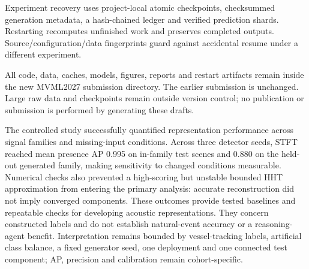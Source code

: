 \documentclass[11pt,letterpaper]{article}
\begin{document}
Experiment recovery uses project-local atomic checkpoints, checksummed generation metadata, a hash-chained ledger and verified prediction shards. Restarting recomputes unfinished work and preserves completed outputs. Source/configuration/data fingerprints guard against accidental resume under a different experiment.\par

All code, data, caches, models, figures, reports and restart artifacts remain inside the new MVML2027 submission directory. The earlier submission is unchanged. Large raw data and checkpoints remain outside version control; no publication or submission is performed by generating these drafts.\par

The controlled study successfully quantified representation performance across signal families and missing-input conditions. Across three detector seeds, STFT reached mean presence AP 0.995 on in-family test scenes and 0.880 on the held-out generated family, making sensitivity to changed conditions measurable. Numerical checks also prevented a high-scoring but unstable bounded HHT approximation from entering the primary analysis: accurate reconstruction did not imply converged components. These outcomes provide tested baselines and repeatable checks for developing acoustic representations. They concern constructed labels and do not establish natural-event accuracy or a reasoning-agent benefit. Interpretation remains bounded by vessel-tracking labels, artificial class balance, a fixed generator seed, one deployment and one connected test component; AP, precision and calibration remain cohort-specific.\par

{\fontsize{9}{11}\selectfont





}
\end{document}
